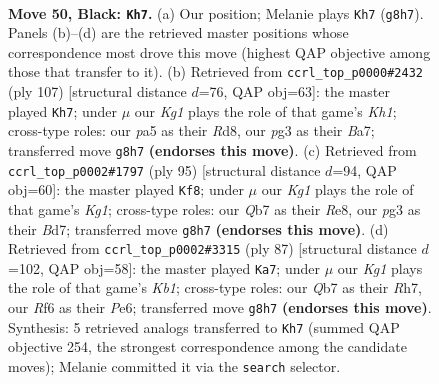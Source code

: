 \documentclass[11pt]{article}
\begin{document}
\clearpage

\begin{figure}[p]\centering
\begin{subfigure}{0.46\textwidth}\centering
\resizebox{\linewidth}{!}{%
\newchessgame
\chessboard[
  setfen={nr4k1/1q6/p2bnr2/P1p2p1p/3p1Pp1/QP4P1/1RNBP2P/2RN2K1 b - - 17 50},
  showmover=false,
  pgfstyle=straightmove, color=movearrow, markmove={g8-h7}
]}
\caption{}
\end{subfigure}\hfill
\begin{subfigure}{0.46\textwidth}\centering
\resizebox{\linewidth}{!}{%
\newchessgame
\chessboard[
  setfen={3r3k/b4pr1/1nq3p1/4pPPp/1Pp1P2P/p1PpNQ2/P2B2RK/4R3 b - - 45 54},
  showmover=false,
  pgfstyle=straightmove, color=movearrow, markmove={h8-h7}
]}
\caption{}
\end{subfigure}
\\[4pt]
\begin{subfigure}{0.46\textwidth}\centering
\resizebox{\linewidth}{!}{%
\newchessgame
\chessboard[
  setfen={1r2r1k1/p2b1n2/P1p2qp1/2Pp1p1p/1p3P2/1P1BPN1P/3QR1P1/2R4K b - - 26 48},
  showmover=false,
  pgfstyle=straightmove, color=movearrow, markmove={g8-f8}
]}
\caption{}
\end{subfigure}\hfill
\begin{subfigure}{0.46\textwidth}\centering
\resizebox{\linewidth}{!}{%
\newchessgame
\chessboard[
  setfen={1k5r/7r/2p1p1n1/p2p1qP1/Pp1PnP2/3N3p/KPP1Q2R/2B1R3 b - - 3 44},
  showmover=false,
  pgfstyle=straightmove, color=movearrow, markmove={b8-a7}
]}
\caption{}
\end{subfigure}
\caption{\textbf{Move 50, Black: \texttt{Kh7}.} (a) Our position; Melanie plays \texttt{Kh7} (\texttt{g8h7}). Panels (b)--(d) are the retrieved master positions whose correspondence most drove this move (highest QAP objective among those that transfer to it). (b) Retrieved from \texttt{ccrl\_top\_p0000\#2432} (ply 107) [structural distance $d$=76, QAP obj=63]: the master played \texttt{Kh7}; under $\mu$ our \emph{Kg1} plays the role of that game's \emph{Kh1}; cross-type roles: our \emph{p}a5 as their \emph{R}d8, our \emph{p}g3 as their \emph{B}a7; transferred move \texttt{g8h7} \textbf{(endorses this move)}. (c) Retrieved from \texttt{ccrl\_top\_p0002\#1797} (ply 95) [structural distance $d$=94, QAP obj=60]: the master played \texttt{Kf8}; under $\mu$ our \emph{Kg1} plays the role of that game's \emph{Kg1}; cross-type roles: our \emph{Q}b7 as their \emph{R}e8, our \emph{p}g3 as their \emph{B}d7; transferred move \texttt{g8h7} \textbf{(endorses this move)}. (d) Retrieved from \texttt{ccrl\_top\_p0002\#3315} (ply 87) [structural distance $d$=102, QAP obj=58]: the master played \texttt{Ka7}; under $\mu$ our \emph{Kg1} plays the role of that game's \emph{Kb1}; cross-type roles: our \emph{Q}b7 as their \emph{R}h7, our \emph{R}f6 as their \emph{P}e6; transferred move \texttt{g8h7} \textbf{(endorses this move)}. Synthesis: 5 retrieved analogs transferred to \texttt{Kh7} (summed QAP objective 254, the strongest correspondence among the candidate moves); Melanie committed it via the \texttt{search} selector.}
\label{fig:thought-m99}
\end{figure}
\end{document}
